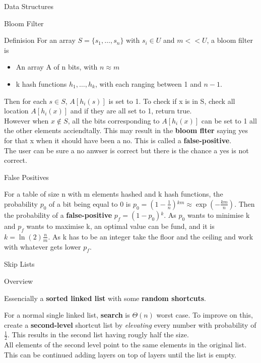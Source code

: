 \documentclass[12pt, letterpaper]{article}
\begin{document}
\begin{section}{Data Structures}
\begin{subsection}{Bloom Filter}
\begin{subsubsection}{Definision}
      For an array \(S = \{ s_{1}, \dots , s_{n} \}\) with \(s_{i} \in U\) and
      \(m << U\), a bloom filter is
      \begin{itemize}
        \item An array A of n bits, with \(n \approx m\)
        \item k hash functions \(h_{1}, \dots , h_{k}\), with each ranging
              between 1 and \(n - 1\).
      \end{itemize}
      Then for each \(s \in S\), \(A[h_{i}(s)]\) is set to 1. To check if x is
      in S, check all location \(A[h_{i}(x)]\) and if they are all set to 1,
      return true. \\
      However when \(x \notin S\), all the bits corresponding to
      \(A[h_{i}(x)]\) can be set to 1 all the other elements acciendtally. This
      may result in the \textbf{bloom flter} saying yes for that x when it
      should have been a no. This is called a \textbf{false-positive}. \\
      The user can be sure a no anwser is correct but there is the chance a yes
      is not correct.

    \end{subsubsection}

    \begin{subsubsection}{False Positives}

      For a table of size n with m elements hashed and k hash functions, the
      probability \(p_{0}\) of a bit being equal to 0 is \(p_{0} = (1 -
      \frac{1}{n}){}^{km} \approx \exp(-\frac{km}{n})\). Then the probability
      of a \textbf{false-positive} \(p_{f} = (1 - p_{0}){}^{k}\). As \(p_{0}\)
      wants to minimise k and \(p_{f}\) wants to maximise k, an optimal value
      can be fund, and it is \(k = \ln(2) \frac{n}{m}\). As k has to be an
      integer take the floor and the ceiling and work with whatever gets lower
      \(p_{f}\).

    \end{subsubsection}

  \end{subsection}

  \begin{subsection}{Skip Lists}

    \begin{subsubsection}{Overview}

      Essencially a \textbf{sorted linked list} with some \textbf{random
        shortcuts}.

      For a normal single linked list, \textbf{search} is \(\Theta(n)\) worst
      case. To improve on this, create a \textbf{second-level} shortcut list by
      \textit{elevating} every number with probability of \(\frac{1}{2}\). This
      results in the second list having rougly half the size. \\
      All elements of the second level point to the same elements in the
      original list. \\
      This can be continued adding layers on top of layers until the list is
      empty.


\end{subsubsection}
\end{subsection}
\end{section}
\end{document}
